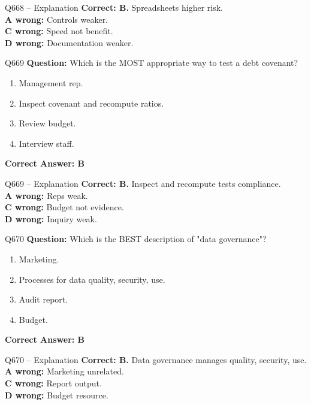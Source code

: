 \documentclass[aspectratio=169,10pt]{beamer}
\begin{document}
	\begin{frame}[t]{Q668 -- Explanation}
		\small
		\textbf{Correct: B.} Spreadsheets higher risk. \\[4pt]
		\textbf{A wrong:} Controls weaker. \\[2pt]
		\textbf{C wrong:} Speed not benefit. \\[2pt]
		\textbf{D wrong:} Documentation weaker.
	\end{frame}
	
	\begin{frame}[t]{Q669}
		\small
		\textbf{Question:} Which is the MOST appropriate way to test a debt covenant?
		\begin{enumerate}[label=\Alph*.,itemsep=1pt,topsep=2pt]
			\item Management rep.
			\item Inspect covenant and recompute ratios.
			\item Review budget.
			\item Interview staff.
		\end{enumerate}
		\vspace{4pt}
		\textbf{Correct Answer: B}
	\end{frame}
	
	\begin{frame}[t]{Q669 -- Explanation}
		\small
		\textbf{Correct: B.} Inspect and recompute tests compliance. \\[4pt]
		\textbf{A wrong:} Reps weak. \\[2pt]
		\textbf{C wrong:} Budget not evidence. \\[2pt]
		\textbf{D wrong:} Inquiry weak.
	\end{frame}
	
	\begin{frame}[t]{Q670}
		\small
		\textbf{Question:} Which is the BEST description of "data governance"?
		\begin{enumerate}[label=\Alph*.,itemsep=1pt,topsep=2pt]
			\item Marketing.
			\item Processes for data quality, security, use.
			\item Audit report.
			\item Budget.
		\end{enumerate}
		\vspace{4pt}
		\textbf{Correct Answer: B}
	\end{frame}
	
	\begin{frame}[t]{Q670 -- Explanation}
		\small
		\textbf{Correct: B.} Data governance manages quality, security, use. \\[4pt]
		\textbf{A wrong:} Marketing unrelated. \\[2pt]
		\textbf{C wrong:} Report output. \\[2pt]
		\textbf{D wrong:} Budget resource.
	\end{frame}
	
\end{document}
